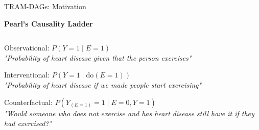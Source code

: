 \documentclass[onlytextwidth,english]{beamer}\usepackage[]{graphicx}\usepackage[]{xcolor}
\begin{document}
\begin{frame}{TRAM-DAGs: Motivation}

\textbf{Pearl's Causality Ladder}

\vspace{-0.5cm}

\begin{columns}

\begin{column}{0.63\textwidth}

Observational: $P(Y=1 \mid E=1)$ \\
{\footnotesize \textit{"Probability of heart disease given that the person exercises"}}

\vspace{0.4cm}

Interventional: $P(Y=1 \mid \text{do}(E=1))$ \\
{\footnotesize \textit{"Probability of heart disease if we made people start exercising"}} 

\vspace{0.4cm}

Counterfactual: $P(Y_{(E=1)} = 1 \mid E=0, Y=1)$ \\
{\footnotesize \textit{"Would someone who does not exercise and has heart disease still have it if they had exercised?"}}

\end{column}


\end{columns}
\end{frame}
\end{document}
